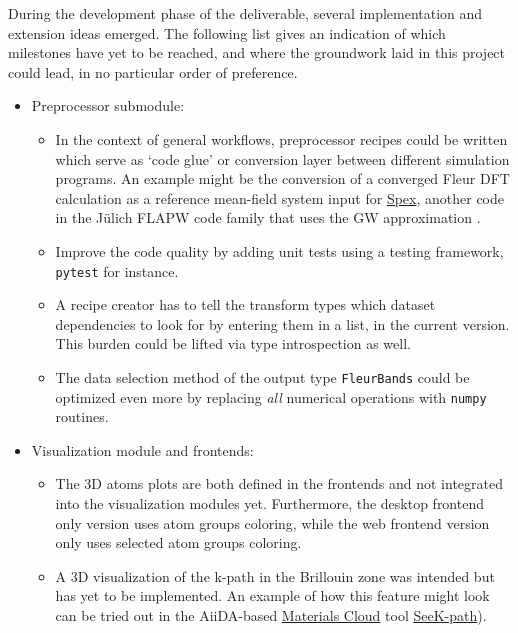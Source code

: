 During the development phase of the deliverable, several implementation and
extension ideas emerged. The following list gives an indication of which
milestones have yet to be reached, and where the groundwork laid in this project
could lead, in no particular order of preference.

\begin{itemize}
\item Preprocessor submodule:
    \begin{itemize}
    \item In the context of general workflows, preprocessor recipes could be
        written which serve as `code glue' or conversion layer between different
        simulation programs. An example might be the conversion of a converged
        Fleur DFT calculation as a reference mean-field system input for
        \href{https://spex.readthedocs.io/en/master/spex_and_fleur.html}{Spex},
        another code in the Jülich FLAPW code family that uses the GW
        approximation \cite{fleur-spex}.
    \item Improve the code quality by adding unit tests using a testing
        framework, \texttt{pytest} for instance.
    \item A recipe creator has to tell the transform types which dataset
        dependencies to look for by entering them in a list, in the current
        version. This burden could be lifted via type introspection as well.
    \item The data selection method of the output type \texttt{FleurBands} could
        be optimized even more by replacing \textit{all} numerical operations
        with \texttt{numpy} routines.
    \end{itemize}
\item Visualization module and frontends:
    \begin{itemize}
    \item The 3D atoms plots are both defined in the frontends and not
        integrated into the visualization modules yet. Furthermore, the desktop
        frontend only version uses atom groups coloring, while the web frontend version
        only uses selected atom groups coloring.
    \item A 3D visualization of the k-path in the Brillouin zone was intended
        but has yet to be implemented. An example of how this feature might look
        can be tried out in the AiiDA-based
        \href{https://www.materialscloud.org/home}{Materials Cloud} tool
        \href{https://www.materialscloud.org/work/tools/seekpath}{SeeK-path}).

\end{itemize}
\end{itemize}
